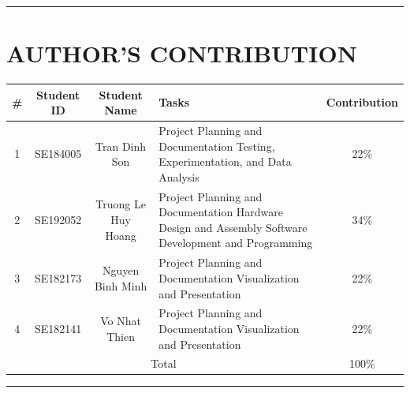 \documentclass[conference, onecolumn]{IEEEtran}
\begin{document}
\vspace{10pt}
\noindent\rule{\textwidth}{0.4pt}
\vspace{10pt}

\section{AUTHOR'S CONTRIBUTION}

\begin{table}[H]
    \centering
    \begin{tabular}{|c|c|c|p{5cm}|c|}
    \hline
         \# & Student ID & Student Name & Tasks & Contribution \\
    \hline
         1 & SE184005 & Tran Dinh Son & Project Planning and Documentation \newline Testing, Experimentation, and Data Analysis & 22\% \\
    \hline
         2 & SE192052 & Truong Le Huy Hoang & Project Planning and Documentation \newline Hardware Design and Assembly \newline Software Development and Programming & 34\% \\
    \hline
         3 & SE182173 & Nguyen Binh Minh & Project Planning and Documentation \newline Visualization and Presentation & 22\% \\
    \hline
         4 & SE182141 & Vo Nhat Thien & Project Planning and Documentation \newline Visualization and Presentation & 22\% \\
    \hline
         \multicolumn{4}{|c|}{Total} & 100\% \\
    \hline
    \end{tabular}
    \label{tab:task_distribution}
\end{table}

\vspace{10pt}
\noindent\rule{\textwidth}{0.4pt}
\vspace{10pt}



\cite{Rahman2020,Guo2020,Singh2019,Zhang2021,Ahmed2018}
\end{document}
